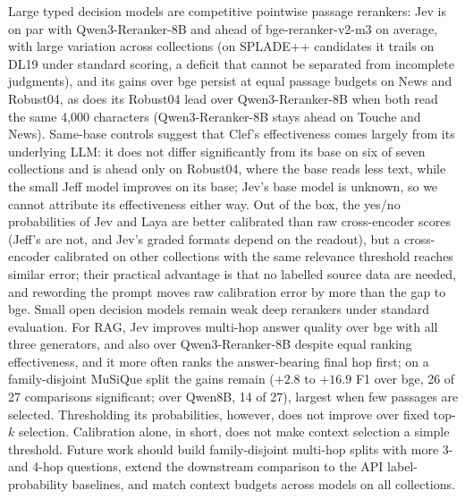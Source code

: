 Large typed decision models are competitive pointwise passage rerankers: Jev is on par with Qwen3-Reranker-8B and ahead of bge-reranker-v2-m3 on average, with large variation across collections (on SPLADE++ candidates it trails on DL19 under standard scoring, a deficit that cannot be separated from incomplete judgments), and its gains over bge persist at equal passage budgets on News and Robust04, as does its Robust04 lead over Qwen3-Reranker-8B when both read the same 4{,}000 characters (Qwen3-Reranker-8B stays ahead on Touche and News). Same-base controls suggest that Clef's effectiveness comes largely from its underlying LLM: it does not differ significantly from its base on six of seven collections and is ahead only on Robust04, where the base reads less text, while the small Jeff model improves on its base; Jev's base model is unknown, so we cannot attribute its effectiveness either way.
Out of the box, the yes/no probabilities of Jev and Laya are better calibrated than raw cross-encoder scores (Jeff's are not, and Jev's graded formats depend on the readout), but a cross-encoder calibrated on other collections with the same relevance threshold reaches similar error; their practical advantage is that no labelled source data are needed, and rewording the prompt moves raw calibration error by more than the gap to bge. Small open decision models remain weak deep rerankers under standard evaluation.
For RAG, Jev improves multi-hop answer quality over bge with all three generators, and also over Qwen3-Reranker-8B despite equal ranking effectiveness, and it more often ranks the answer-bearing final hop first; on a family-disjoint MuSiQue split the gains remain ($+2.8$ to $+16.9$ F1 over bge, 26 of 27 comparisons significant; over Qwen8B, 14 of 27), largest when few passages are selected. Thresholding its probabilities, however, does not improve over fixed top-$k$ selection. Calibration alone, in short, does not make context selection a simple threshold.
Future work should build family-disjoint multi-hop splits with more 3- and 4-hop questions, extend the downstream comparison to the API label-probability baselines, and match context budgets across models on all collections.
